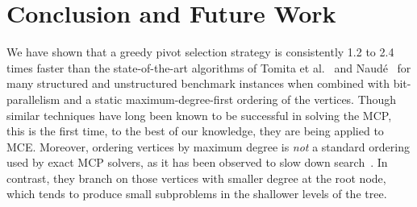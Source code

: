 \documentclass[final,1p]{elsarticle-modified}
\newcommand{\alg}[1]{\textbf{#1}}
\begin{document}


\section{Conclusion and Future Work}
\label{section:conclusion}
We have shown that a greedy pivot selection strategy is consistently 1.2 to 2.4 times faster than the state-of-the-art algorithms of Tomita et al.~\cite{tomita-2006} and Naud\'e~\cite{naude-2016} for many structured and unstructured benchmark instances when combined with bit-parallelism and a static maximum-degree-first ordering of the vertices. Though similar techniques have long been known to be successful in solving the MCP, this is the first time, to the best of our knowledge, they are being applied to MCE. Moreover, ordering vertices by maximum degree is \emph{not} a standard ordering used by exact MCP solvers, as it has been observed to slow down search~\cite{tomita-kameda-2006}. In contrast, they branch on those vertices with smaller degree at the root node, which tends to produce small subproblems in the shallower levels of the tree.
\end{document}
